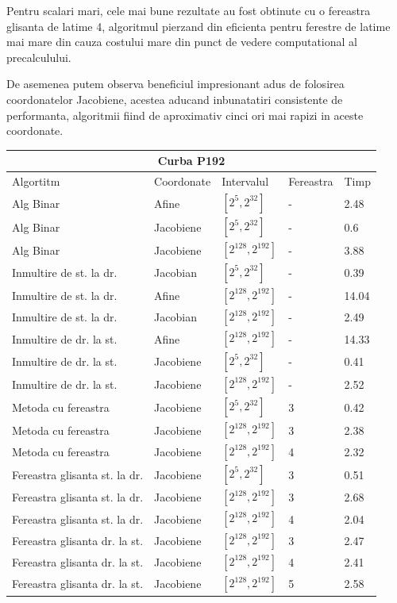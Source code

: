Pentru scalari mari, cele mai bune rezultate au fost obtinute cu o fereastra glisanta de latime 4, algoritmul pierzand din eficienta pentru ferestre de latime mai mare din cauza costului mare din punct de vedere computational al precalculului. 

De asemenea putem observa beneficiul impresionant adus de folosirea coordonatelor Jacobiene, acestea aducand inbunatatiri consistente de performanta, algoritmii fiind de aproximativ cinci ori mai rapizi in aceste coordonate. 


\begin{tabular}{ |p{5cm}||p{3cm}|p{3cm}|p{2cm}|p{1cm}|  }
 \hline
 \multicolumn{5}{|c|}{Curba P192} \\
 \hline
 Algortitm& Coordonate &Intervalul &Fereastra &Timp\\
 \hline
 Alg Binar & Afine  &$[2^{5},2^{32}]$& - & 2.48\\
 Alg Binar&Jacobiene  & $[2^{5},2^{32}]$ & - & 0.6\\
 Alg Binar&Jacobiene  & $[2^{128},2^{192}]$ & - & 3.88\\
 Inmultire de st. la dr. & Jacobian & $[2^{5},2^{32}]$& - & 0.39\\
 Inmultire de st. la dr. & Afine & $[2^{128},2^{192}]$& - & 14.04\\
 Inmultire de st. la dr. & Jacobian & $[2^{128},2^{192}]$& - & 2.49\\
 Inmultire de dr. la st. &Afine & $[2^{128},2^{192}]$ & - & 14.33\\
 Inmultire de dr. la st. &Jacobiene & $[2^{5},2^{32}]$ & - & 0.41\\
 Inmultire de dr. la st. &Jacobiene & $[2^{128},2^{192}]$ & - & 2.52\\
 Metoda cu fereastra& Jacobiene & $[2^{5},2^{32}]$ & 3 & 0.42\\
 Metoda cu fereastra& Jacobiene & $[2^{128},2^{192}]$ & 3 & 2.38\\
 Metoda cu fereastra& Jacobiene & $[2^{128},2^{192}]$ & 4 & 2.32\\
 Fereastra glisanta st. la dr.& Jacobiene  & $[2^{5},2^{32}]$& 3 & 0.51\\
 Fereastra glisanta st. la dr.& Jacobiene  & $[2^{128},2^{192}]$& 3 & 2.68\\
  Fereastra glisanta st. la dr.& Jacobiene  & $[2^{128},2^{192}]$& 4 & 2.04\\
 Fereastra glisanta dr. la st.& Jacobiene  & $[2^{128},2^{192}]$& 3 & 2.47\\
 Fereastra glisanta dr. la st.& Jacobiene  & $[2^{128},2^{192}]$& 4 & 2.41\\
 Fereastra glisanta dr. la st.& Jacobiene  & $[2^{128},2^{192}]$& 5 & 2.58\\
 \hline
\end{tabular}

